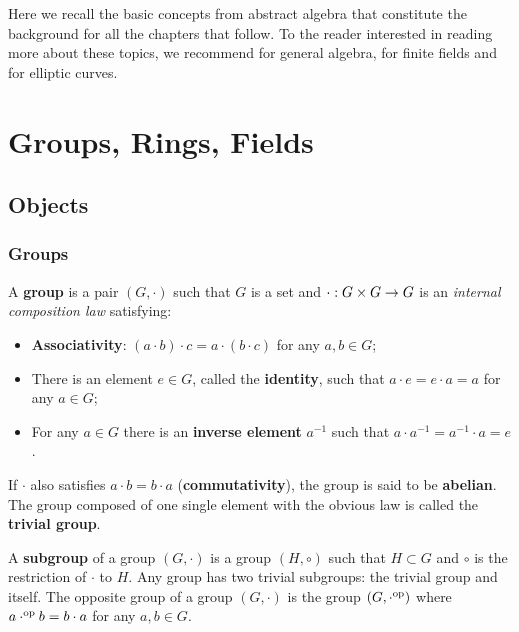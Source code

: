 Here we recall the basic concepts from abstract algebra that
constitute the background for all the chapters that follow. To the
reader interested in reading more about these topics, we recommend
\cite{lang} for general algebra, \cite{lidl+niederreiter:2} for finite
fields and \cite{silverman:elliptic,silverman:advanced} for elliptic
curves.

\section{Groups, Rings, Fields}
\label{sec:ring-fields}

\subsection{Objects}
\label{sec:ring-fields:objects}

\subsubsection{Groups}

A \textbf{group} is a pair $(G,\cdot)$ such that $G$ is a
set and $\cdot:G\times G\rightarrow G$ is an \emph{internal composition law}
satisfying:
\begin{itemize}
\item {}\textbf{Associativity}: $(a\cdot b)\cdot c
  = a \cdot (b\cdot c)$ for any $a,b\in G$;
\item There is an element $e\in G$, called the
  \textbf{identity}, such that $a\cdot e =
  e\cdot a = a$ for any $a\in G$;
\item For any $a\in G$ there is an
  \textbf{inverse element} $a^{-1}$ such that
  $a\cdot a^{-1} = a^{-1}\cdot a = e$.
\end{itemize}
If $\cdot$ also satisfies $a\cdot b=b\cdot a$
(\textbf{commutativity}), the group is said to be
\textbf{abelian}. The group composed of one
single element with the obvious law is called the
\textbf{trivial group}.

A \textbf{subgroup} of a group $(G,\cdot)$ is a group
$(H,\circ)$ such that $H\subset G$ and $\circ$ is the restriction of
$\cdot$ to $H$. Any group has two trivial subgroups: the trivial group
and itself. The 
opposite group of a group $(G,\cdot)$ is
the group $(G,\cdot^{\mathrm{op}})$ where $a\cdot^{\mathrm{op}} b=b\cdot a$ for any
$a,b\in G$.

